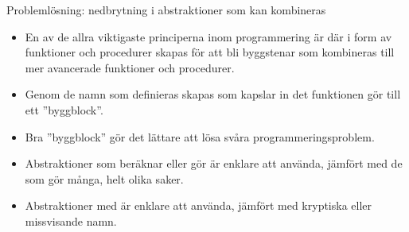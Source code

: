 \documentclass{simpleslides}
\begin{document}
\begin{Slide}{Problemlösning: nedbrytning i abstraktioner som kan kombineras}\SlideFontSmall
\begin{itemize}
\item En av de allra viktigaste principerna inom programmering är  där   i form av funktioner och procedurer skapas för att bli byggstenar som kombineras till mer avancerade funktioner och procedurer.

\item Genom de namn som definieras skapas  som kapslar in det funktionen gör till ett ''byggblock''.

\item Bra ''byggblock'' gör det lättare att lösa svåra programmeringsproblem.

\item Abstraktioner som beräknar eller gör  är enklare att använda, jämfört med de som gör många, helt olika saker.

\item Abstraktioner med  är enklare att använda, jämfört med kryptiska eller missvisande namn.
\end{itemize}

\end{Slide}
\end{document}

